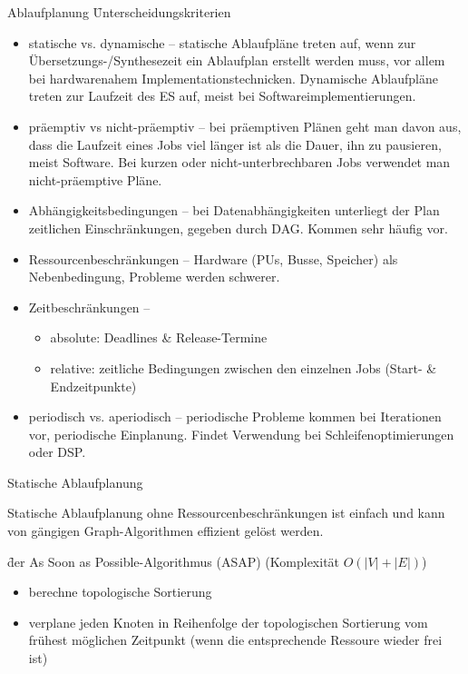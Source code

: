 \begin{chapter}{Ablaufplanung}
  \f{Unterscheidungskriterien}
  \begin{itemize}
   \item statische vs. dynamische -- statische Ablaufpläne treten auf, wenn zur Übersetzungs-/Synthesezeit ein Ablaufplan erstellt werden muss, vor allem bei hardwarenahem Implementationstechnicken. Dynamische Ablaufpläne treten zur Laufzeit des ES auf, meist bei Softwareimplementierungen.
   \item präemptiv vs nicht-präemptiv -- bei präemptiven Plänen geht man davon aus, dass die Laufzeit eines Jobs viel länger ist als die Dauer, ihn zu pausieren, meist Software. Bei kurzen oder nicht-unterbrechbaren Jobs verwendet man nicht-präemptive Pläne.
   \item Abhängigkeitsbedingungen -- bei Datenabhängigkeiten unterliegt der Plan zeitlichen Einschränkungen, gegeben durch DAG. Kommen sehr häufig vor.
   \item Ressourcenbeschränkungen -- Hardware (PUs, Busse, Speicher) als Nebenbedingung, Probleme werden schwerer.
   \item Zeitbeschränkungen -- 
   \begin{itemize}
    \item absolute: Deadlines \& Release-Termine
    \item relative: zeitliche Bedingungen zwischen den einzelnen Jobs (Start- \& Endzeitpunkte)
   \end{itemize}
   \item periodisch vs. aperiodisch -- periodische Probleme kommen bei Iterationen vor, periodische Einplanung. Findet Verwendung bei Schleifenoptimierungen oder DSP.
  \end{itemize}
  
  \begin{section}{Statische Ablaufplanung}
   \begin{subsection}{Statische Ablaufplanung ohne Ressourcenbeschränkungen} 
    ist einfach und kann von gängigen Graph-Algorithmen effizient gelöst werden.
    
   \f{der As Soon as Possible-Algorithmus (ASAP) (Komplexität $O(|V| + |E|)$)}
   \begin{itemize}
    \item berechne topologische Sortierung
    \item verplane jeden Knoten in Reihenfolge der topologischen Sortierung vom frühest möglichen Zeitpunkt (wenn die entsprechende Ressoure wieder frei ist)
   \end{itemize}


\end{subsection}
\end{section}
\end{chapter}
